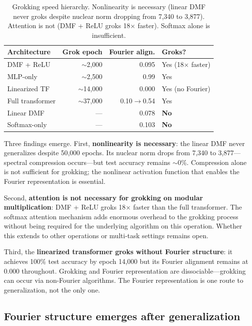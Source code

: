\documentclass{article}
\begin{document}
\begin{table}[t]
\centering
\small
\begin{tabular}{lrrl}
\toprule
Architecture & Grok epoch & Fourier align. & Groks? \\
\midrule
DMF + ReLU     & $\sim$2{,}000   & 0.095 & Yes (18$\times$ faster) \\
MLP-only       & $\sim$2{,}500   & 0.99  & Yes \\
Linearized TF  & $\sim$14{,}000  & 0.000 & Yes (no Fourier) \\
Full transformer & $\sim$37{,}000 & 0.10$\to$0.54 & Yes \\
Linear DMF     & ---          & 0.078 & \textbf{No} \\
Softmax-only   & ---          & 0.103 & \textbf{No} \\
\bottomrule
\end{tabular}
\caption{Grokking speed hierarchy. Nonlinearity is necessary (linear DMF never
groks despite nuclear norm dropping from 7{,}340 to 3{,}877). Attention is not
(DMF + ReLU groks 18$\times$ faster). Softmax alone is insufficient.}
\label{tab:grokking_speed}
\end{table}

Three findings emerge. First, \textbf{nonlinearity is necessary}: the linear
DMF never generalizes despite 50{,}000 epochs. Its nuclear norm drops from
7{,}340 to 3{,}877---spectral compression occurs---but test accuracy remains
$\sim$0\%. Compression alone is not sufficient for grokking; the nonlinear
activation function that enables the Fourier representation is essential.

Second, \textbf{attention is not necessary for grokking on modular
multiplication}: DMF + ReLU groks 18$\times$ faster than the full
transformer. The softmax attention mechanism adds enormous overhead to the
grokking process without being required for the underlying algorithm on this
operation. Whether this extends to other operations or multi-task settings
remains open.

Third, the \textbf{linearized transformer groks without Fourier structure}:
it achieves 100\% test accuracy by epoch 14{,}000 but its Fourier alignment
remains at 0.000 throughout. Grokking and Fourier representation are
dissociable---grokking can occur via non-Fourier algorithms. The Fourier
representation is one route to generalization, not the only one.

\subsection{Fourier structure emerges after generalization}
\label{sec:fourier_trajectory}
\end{document}

